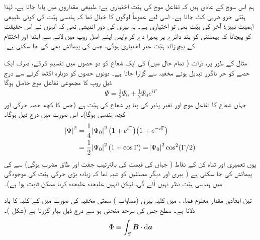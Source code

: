  ہم اس سوچ کے عادی ہیں کہ تفاعل موج کی ہیّت اختیاری ہے؛ طبیعی مقداروں میں  پایا جاتا ہے، لہٰذا ہیّتی جزو ضربی کٹ جاتا ہے۔ اسی لیے عموماً لوگوں کا خیال تھا کہ ہندسی ہیّت کی کوئی طبیعی اہمیت نہیں؛ آخر  کی ہیّت بھی تو اختیاری ہے۔ یہ بیری کی دور اندیشی تھی کہ انہوں نے اس حقیقت کو پہچانا کہ ہیملٹنی کو بند دائرے پر پھیرا دے کر واپس اپنے اصل روپ میں لانے سے ابتدا اور اختتام کے بیچ زائد ہیّت غیر اختیاری ہوگی، جس کی پیمائش بھی کی جا سکتی ہے۔
 
 مثال کے طور پر، ذرات ( تمام حال  میں) کی ایک شعاع کو دو حصوں میں تقسیم کرکے، صرف ایک حصے کو حر ناگزر تبدیل ہوتے مخفیہ سے گزارا جاتا ہے۔ دونوں حصوں کو دوبارہ اکٹھا کرنے سے درج ذیل روپ کا مجموعی تفاعل موج حاصل ہوگا 
\begin{align}
\Psi = \frac{1}{2} \Psi_0 + \frac{1}{2} \Psi_0 e^{i \Gamma}
\end{align}
جہاں   شعاع کا تفاعل موج اور  تغیر پذیر  کی بنا پر شعاع کی  ہیّت ہے (جس کا کچھ حصہ حرکی اور کچھ ہندسی ہوگا)۔ اس صورت میں درج ذیل ہوگا۔
\begin{align}\label{مساوات_حر_ہیّتی_انتقال}
\abs{\Psi}^2 &= \frac{1}{4} \abs{\Psi_0}^2 \big ( 1 + e^{i \Gamma} \big ) \big ( 1 + e^{- i \Gamma} \big ) \nonumber\\
&= \frac{1}{2} \abs{\Psi_0}^2 (1 + \cos \Gamma) = \abs{\Psi_0}^2 \cos^2 (\Gamma/2)
\end{align}
یوں تعمیری اور تباہ کن کے نقاط ( جہاں  کی قیمت  کی بالترتیب جفت اور طاق مضرب ہوگی) سے  کی پیمائش کی جا سکتی ہے ( بیری اور دیگر مصنفین کو شبہ تھا کہ زیادہ بڑی حرکی ہیّت کی موجودگی میں ہندسی ہیّت نظر نہیں آئے گی، لیکن انہیں علیحدہ علیحدہ کرنا ممکن ثابت ہوا ہے)۔ 

 تین ابعادی مقدار معلوم فضا، ، میں کلیہ بیری (مساوات ) سمتی مخفیہ  کی صورت میں  کے کلیہ کا یاد دلاتا ہے۔ سطح  جس کی سرحد منحنی  ہو سے درج ذیل بہاو گزرتا ہے (شکل )۔ 
\begin{align}
\Phi \equiv \int_S \kvec{B} \cdot \dif \kvec{a}
\end{align}

